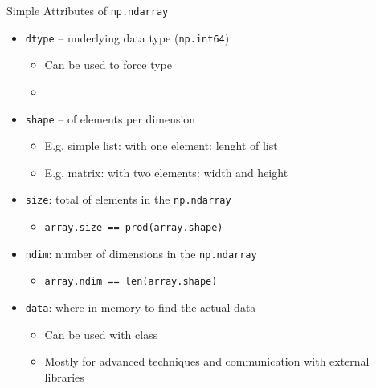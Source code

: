 \begin{frame}[fragile]{Simple Attributes of \texttt{np.ndarray}}
%
\begin{itemize}
\item \texttt{dtype} -- underlying data type (\eg \texttt{np.int64})
	\begin{itemize}
	\item Can be used to force type
	\item {}
	\end{itemize}
\item \texttt{shape} --  of elements per dimension
	\begin{itemize}
	\item E.\;g. simple list:  with one element: lenght of list
	\item E.\;g. matrix:  with two elements: width and height
	\end{itemize}
\item \texttt{size}: total of elements in the \texttt{np.ndarray}
	\begin{itemize}
	\item \texttt{array.size == prod(array.shape)}
	\end{itemize}
\item \texttt{ndim}: number of dimensions in the \texttt{np.ndarray}
	\begin{itemize}
	\item \texttt{array.ndim == len(array.shape)}
	\end{itemize}
\item \texttt{data}: where in memory to find the actual data
	\begin{itemize}
	\item Can be used with  class
	\item Mostly for advanced techniques and communication with external libraries
	\end{itemize}
\end{itemize}
%
\end{frame}


